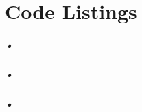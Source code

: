 \documentclass[a4paper, 12pt]{report}
\begin{document}
\appendix
\chapter{Code Listings}
\label{cha:app-code}

\paragraph{•}
\begin{minipage}{\linewidth}

\end{minipage}

\paragraph{•}
\begin{minipage}{\linewidth}

\end{minipage}

\paragraph{•}
\begin{minipage}{\linewidth}

\end{minipage}

\printglossary[type=\acronymtype,title={Terms and Abbreviations}]
\newpage

{}

\end{document}
